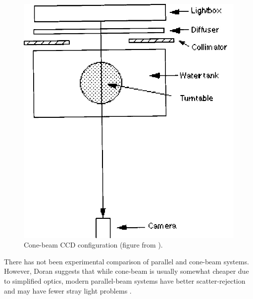 \documentclass[12pt]{article}
\begin{document}
\begin{figure}[H]
\centering
\includegraphics[scale=0.3]{Wolodzko_1999_conesetup.jpg}
\caption{Cone-beam CCD configuration (figure from \cite{Wolodzko:1999}).}
\end{figure}


There has not been experimental comparison of parallel and cone-beam systems. However,  Doran suggests that while cone-beam is usually somewhat cheaper due to simplified optics, modern parallel-beam systems have better scatter-rejection and may have fewer stray light problems \cite{Doran:2008kh, Olding:2011eta, Thomas:2011eja}.



 

 




\end{document}
